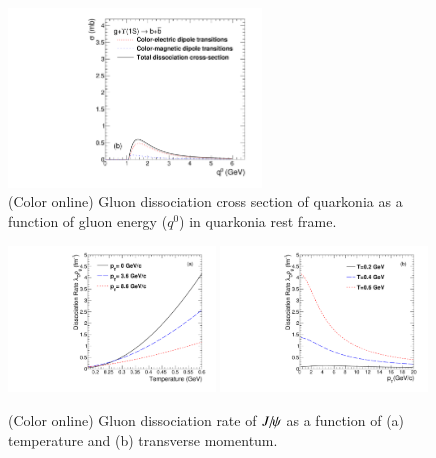 {  
  \begin{figure}
    \includegraphics[width=0.60\textwidth]{Figures/Quarkonia_502TeV/Fig1b_Y1S_SigmaDq0.pdf}
    \caption{(Color online) Gluon dissociation cross section of quarkonia as a function of gluon energy ($q^{0}$) in
      quarkonia rest frame.}
    \label{fig:SigmaDQ0}
  \end{figure}
  


  \begin{figure}
    \includegraphics[width=0.49\textwidth]{Figures/Quarkonia_276TeV/Fig3a_DRateVsT.pdf}
    \includegraphics[width=0.49\textwidth]{Figures/Quarkonia_276TeV/Fig3b_DRateVsPt.pdf}
    \caption{(Color online) Gluon dissociation rate of $J\hspace{-.08em}/\hspace{-.14em}\psi$ as a function of (a) temperature and  
      (b) transverse momentum.}
    \label{fig:DRateVsTempAndPt}
  \end{figure}
}
